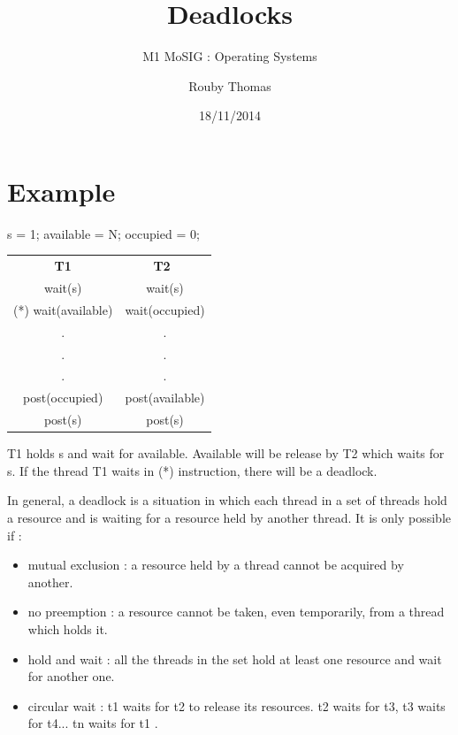 \documentclass[a4paper,10pt]{article}
\title{\textbf{Deadlocks}}
\subtitle{M1 MoSIG : Operating Systems}
\author{Rouby Thomas}
\date{18/11/2014}
\begin{document}
\maketitle

\section{Example}

  \begin{center}
  s = 1;
  available = N;
  occupied = 0;
  
    \begin{tabular}{cc}
     \textbf{T1} & \textbf{T2} \\
      wait(s) & wait(s)\\
     (*) wait(available) & wait(occupied) \\
      . & . \\
      . & . \\
      . & . \\
      post(occupied) & post(available) \\
      post(s) & post(s) \\
    \end{tabular}
  \end{center}

T1 holds s and wait for available. Available will be release by T2 which waits for s.
If the thread T1 waits in (*) instruction, there will be a deadlock.

In general, a deadlock is a situation in which each thread in a set of threads hold a resource and is waiting for a resource held by another thread.
It is only possible if :
\begin{itemize}
  \item mutual exclusion : a resource held by a thread cannot be acquired by another.
  \item no preemption : a resource cannot be taken, even temporarily, from a thread which holds it.
  \item hold and wait : all the threads in the set hold at least one resource and wait for another one.
  \item circular wait : t1 waits for t2 to release its resources. t2 waits for t3, t3 waits for t4... tn waits for t1 .
\end{itemize}
\end{document}
